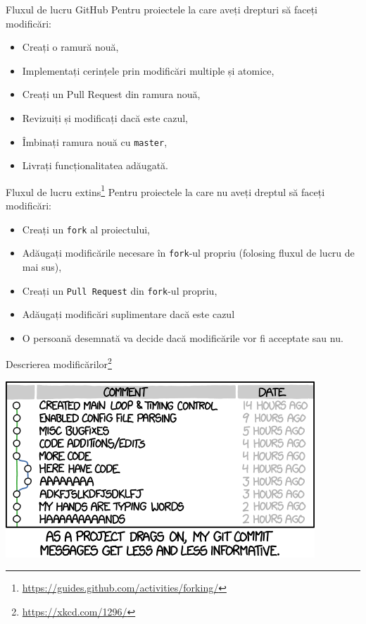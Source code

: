 \documentclass[presentation]{beamer}
\begin{document}
\begin{frame}[label={sec:orgf583bd4},fragile]{Fluxul de lucru GitHub}
 Pentru proiectele la care aveți drepturi să faceți modificări:
\begin{itemize}
\item Creați o ramură nouă,
\item Implementați cerințele prin \alert{modificări multiple și atomice},
\item Creați un \alert{Pull Request} din ramura nouă,
\item Revizuiți și modificați dacă este cazul,
\item Îmbinați ramura nouă cu \texttt{master},
\item Livrați funcționalitatea adăugată.
\end{itemize}
\end{frame}
\begin{frame}[label={sec:org679378a},fragile]{Fluxul de lucru extins\footnote{\url{https://guides.github.com/activities/forking/}}}
 Pentru proiectele la care nu aveți dreptul să faceți modificări:
\begin{itemize}
\item Creați un \texttt{fork} al proiectului,
\item Adăugați modificările necesare în \texttt{fork}-ul propriu (folosing fluxul de lucru de mai sus),
\item Creați un \texttt{Pull Request} din \texttt{fork}-ul propriu,
\item Adăugați modificări suplimentare dacă este cazul
\item O persoană desemnată va decide dacă modificările vor fi acceptate sau nu.
\end{itemize}
\end{frame}
\begin{frame}[label={sec:orgbde4efc}]{Descrierea modificărilor\footnote{\url{https://xkcd.com/1296/}}}
\begin{center}
\includegraphics[width=.7\textwidth]{img/xkcd-git-commit.png}
\end{center}
\end{frame}
\end{document}
